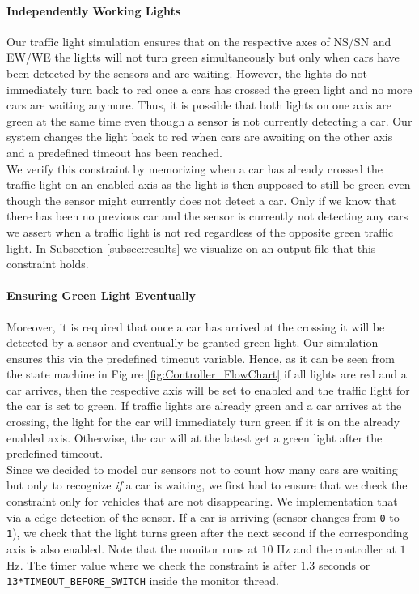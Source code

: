 \documentclass[10pt,bibliography=totocnumbered,listof=totocnumbered, footsepline, headsepline]{scrreprt}
\begin{document}
        \paragraph*{Independently Working Lights}
        Our traffic light simulation ensures that on the respective axes of NS/SN and EW/WE the lights will not turn green simultaneously but only when cars have been detected by the sensors and are waiting. However, the lights do not immediately turn back to red once a cars has crossed the green light and no more cars are waiting anymore. Thus, it is possible that both lights on one axis are green at the same time even though a sensor is not currently detecting a car. Our system changes the light back to red when cars are awaiting on the other axis and a predefined timeout has been reached. \\
        We verify this constraint by memorizing when a car has already crossed the traffic light on an enabled axis as the light is then supposed to still be green even though the sensor might currently does not detect a car. Only if we know that there has been no previous car and the sensor is currently not detecting any cars we assert when a traffic light is not red regardless of the opposite green traffic light. In Subsection \ref{subsec:results} we visualize on an output file that this constraint holds.
        
        \paragraph*{Ensuring Green Light Eventually}
        Moreover, it is required that once a car has arrived at the crossing it will be detected by a sensor and eventually be granted green light. Our simulation ensures this via the predefined timeout variable. Hence, as it can be seen from the state machine in Figure \ref{fig:Controller_FlowChart} if all lights are red and a car arrives, then the respective axis will be set to enabled and the traffic light for the car is set to green. If traffic lights are already green and a car arrives at the crossing, the light for the car will immediately turn green if it is on the already enabled axis. Otherwise, the car will at the latest get a green light after the predefined timeout.\\
        Since we decided to model our sensors not to count how many cars are waiting but only to recognize \textit{if} a car is waiting, we first had to ensure that we check the constraint only for vehicles that are not disappearing. We implementation that via a edge detection of the sensor. If a car is arriving (sensor changes from \texttt{0} to \texttt{1}), we check that the light turns green after the next second if the corresponding axis is also enabled. Note that the monitor runs at $10$ Hz and the controller at $1$ Hz. The timer value where we check the constraint is after $1.3$ seconds or \texttt{13*TIMEOUT\_BEFORE\_SWITCH} inside the monitor thread.
    
\end{document}
